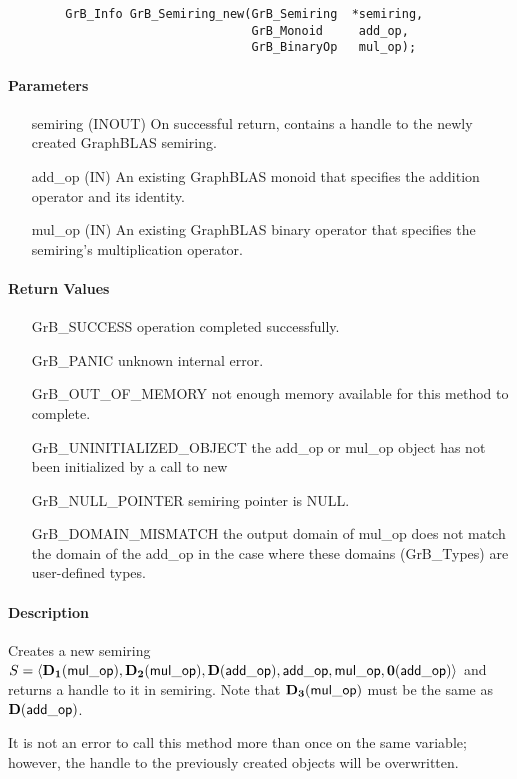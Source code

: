 \begin{verbatim}
        GrB_Info GrB_Semiring_new(GrB_Semiring  *semiring,
                                  GrB_Monoid     add_op,
                                  GrB_BinaryOp   mul_op);
\end{verbatim}

\paragraph{Parameters}

\begin{itemize}[leftmargin=1.1in]
    \item[{\sf semiring}] ({\sf INOUT}) On successful return, contains a 
    handle to the newly created GraphBLAS semiring.
    \item[{\sf add\_op}]  ({\sf IN}) An existing GraphBLAS monoid that specifies 
    the addition operator and its identity.
    \item[{\sf mul\_op}]  ({\sf IN}) An existing GraphBLAS binary operator that 
    specifies the semiring's multiplication operator.
\end{itemize}


\paragraph{Return Values}

\begin{itemize}[leftmargin=2.1in]
\item[{\sf GrB\_SUCCESS}]           operation completed successfully.
\item[{\sf GrB\_PANIC}]             unknown internal error.
\item[{\sf GrB\_OUT\_OF\_MEMORY}]          not enough memory available for this method to complete.
\item[{\sf GrB\_UNINITIALIZED\_OBJECT}]          the {\sf add\_op} or {\sf mul\_op} object has
                                    not been initialized by a call to {\sf new}
\item[{\sf GrB\_NULL\_POINTER}]    {\sf semiring} pointer is {\sf NULL}.
\item[{\sf GrB\_DOMAIN\_MISMATCH}]  the output domain of {\sf mul\_op} does not
                                    match the domain of the {\sf add\_op} in the
                                    case where these domains ({\sf GrB\_Type}s)
                                    are user-defined types.
\end{itemize}

\paragraph{Description}

Creates a new semiring $S = \langle \bold{D_1}({\sf mul\_op}), 
\bold{D_2}({\sf mul\_op}), \bold{D}({\sf add\_op}), {\sf add\_op}, 
{\sf mul\_op}, \bold{0}({\sf add\_op})\rangle$ and returns a handle to it in 
{\sf semiring}.  Note that $\bold{D_3}({\sf mul\_op})$ must be the same as 
$\bold{D}({\sf add\_op})$.

It is not an error to call this method more than once on the same variable;  
however, the handle to the previously created objects will be overwritten. 